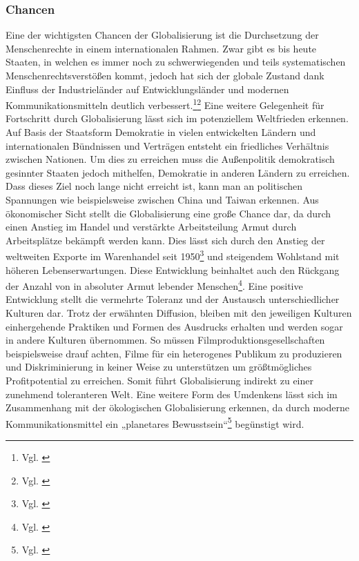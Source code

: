 \documentclass[12pt]{article}
\begin{document}
\subsubsection{Chancen}
Eine der wichtigsten Chancen der Globalisierung ist die Durchsetzung der Menschenrechte in einem internationalen Rahmen. Zwar gibt es bis heute Staaten, in welchen es immer noch zu schwerwiegenden und teils systematischen Menschenrechtsverstößen kommt, jedoch hat sich der globale Zustand dank Einfluss der Industrieländer auf Entwicklungsländer und modernen Kommunikationsmitteln deutlich verbessert.\footnote{Vgl. \cite{Lohrmann}}\footnote{Vgl. \cite{WikipMenschRechte}} 
Eine weitere Gelegenheit für Fortschritt durch Globalisierung lässt sich im potenziellem Weltfrieden erkennen. Auf Basis der Staatsform Demokratie in vielen entwickelten Ländern und internationalen Bündnissen und Verträgen entsteht ein friedliches Verhältnis zwischen Nationen. Um dies zu erreichen muss die Außenpolitik demokratisch gesinnter Staaten jedoch mithelfen, Demokratie in anderen Ländern zu erreichen. Dass dieses Ziel noch lange nicht erreicht ist, kann man an politischen Spannungen wie beispielsweise zwischen China und Taiwan erkennen.
Aus ökonomischer Sicht stellt die Globalisierung eine große Chance dar, da durch einen Anstieg im Handel und verstärkte Arbeitsteilung Armut durch Arbeitsplätze bekämpft werden kann. Dies lässt sich durch den Anstieg der weltweiten Exporte im Warenhandel seit 1950\footnote{Vgl. \cite{Urmersbach2021}} und steigendem Wohlstand mit höheren Lebenserwartungen. Diese Entwicklung beinhaltet auch den Rückgang der Anzahl von in absoluter Armut lebender Menschen\footnote{Vgl. \cite{Roser2016}}.
Eine positive Entwicklung stellt die vermehrte Toleranz und der Austausch unterschiedlicher Kulturen dar. Trotz der erwähnten Diffusion, bleiben mit den jeweiligen Kulturen einhergehende Praktiken und Formen des Ausdrucks erhalten und werden sogar in andere Kulturen übernommen. So müssen Filmproduktionsgesellschaften beispielsweise drauf achten, Filme für ein heterogenes Publikum zu produzieren und Diskriminierung in keiner Weise zu unterstützen um größtmögliches Profitpotential zu erreichen. Somit führt Globalisierung indirekt zu einer zunehmend toleranteren Welt. Eine weitere Form des Umdenkens lässt sich im Zusammenhang mit der ökologischen Globalisierung erkennen, da durch moderne Kommunikationsmittel ein „planetares Bewusstsein“\footnote{Vgl. \cite{WikipGlobWirtsch}} begünstigt wird.
\end{document}
